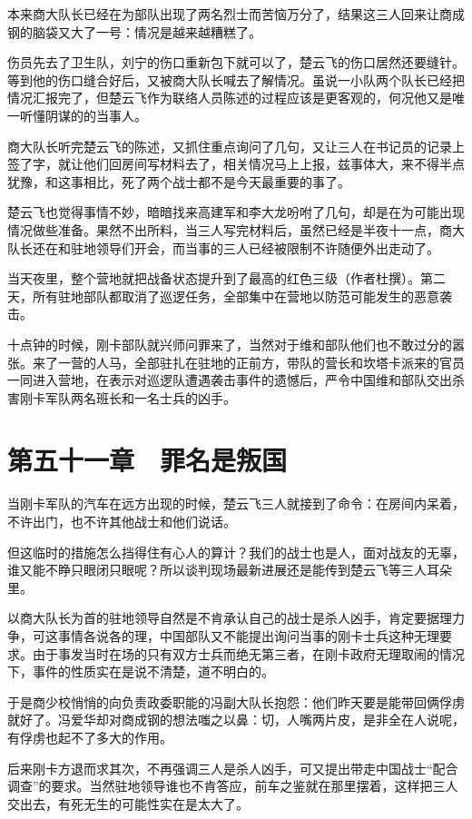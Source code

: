 本来商大队长已经在为部队出现了两名烈士而苦恼万分了，结果这三人回来让商成钢的脑袋又大了一号：情况是越来越糟糕了。

伤员先去了卫生队，刘宁的伤口重新包下就可以了，楚云飞的伤口居然还要缝针。等到他的伤口缝合好后，又被商大队长喊去了解情况。虽说一小队两个队长已经把情况汇报完了，但楚云飞作为联络人员陈述的过程应该是更客观的，何况他又是唯一听懂阴谋的的当事人。

商大队长听完楚云飞的陈述，又抓住重点询问了几句，又让三人在书记员的记录上签了字，就让他们回房间写材料去了，相关情况马上上报，兹事体大，来不得半点犹豫，和这事相比，死了两个战士都不是今天最重要的事了。

楚云飞也觉得事情不妙，暗暗找来高建军和李大龙吩咐了几句，却是在为可能出现情况做些准备。果然不出所料，当三人写完材料后，虽然已经是半夜十一点，商大队长还在和驻地领导们开会，而当事的三人已经被限制不许随便外出走动了。

当天夜里，整个营地就把战备状态提升到了最高的红色三级（作者杜撰）。第二天，所有驻地部队都取消了巡逻任务，全部集中在营地以防范可能发生的恶意袭击。

十点钟的时候，刚卡部队就兴师问罪来了，当然对于维和部队他们也不敢过分的嚣张。来了一营的人马，全部驻扎在驻地的正前方，带队的营长和坎塔卡派来的官员一同进入营地，在表示对巡逻队遭遇袭击事件的遗憾后，严令中国维和部队交出杀害刚卡军队两名班长和一名士兵的凶手。

\section{第五十一章　罪名是叛国}

当刚卡军队的汽车在远方出现的时候，楚云飞三人就接到了命令：在房间内呆着，不许出门，也不许其他战士和他们说话。

但这临时的措施怎么挡得住有心人的算计？我们的战士也是人，面对战友的无辜，谁又能不睁只眼闭只眼呢？所以谈判现场最新进展还是能传到楚云飞等三人耳朵里。

以商大队长为首的驻地领导自然是不肯承认自己的战士是杀人凶手，肯定要据理力争，可这事情各说各的理，中国部队又不能提出询问当事的刚卡士兵这种无理要求。由于事发当时在场的只有双方士兵而绝无第三者，在刚卡政府无理取闹的情况下，事件的性质实在是说不清楚，道不明白的。

于是商少校悄悄的向负责政委职能的冯副大队长抱怨：他们昨天要是能带回俩俘虏就好了。冯爱华却对商成钢的想法嗤之以鼻：切，人嘴两片皮，是非全在人说呢，有俘虏也起不了多大的作用。

后来刚卡方退而求其次，不再强调三人是杀人凶手，可又提出带走中国战士“配合调查”的要求。当然驻地领导谁也不肯答应，前车之鉴就在那里摆着，这样把三人交出去，有死无生的可能性实在是太大了。

